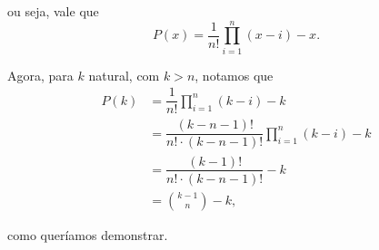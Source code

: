 \documentclass{article}
\begin{document}
\noindent ou seja, vale que
\[P(x) = \dfrac{1}{n!}\prod_{i = 1}^{n} (x - i) - x.\]

Agora, para $k$ natural, com $k > n$, notamos que
\begin{equation*}
    \begin{split}
        P(k) & = \dfrac{1}{n!}\prod_{i = 1}^{n} (k - i) - k \\
        & = \dfrac{(k - n - 1)!}{n!\cdot (k - n - 1)!}\prod_{i = 1}^{n} (k - i) - k \\
        & = \dfrac{(k - 1)!}{n!\cdot (k - n - 1)!} - k \\
        & = \binom{k - 1}{n} - k,
    \end{split}
\end{equation*}

\noindent como queríamos demonstrar.
\end{document}
